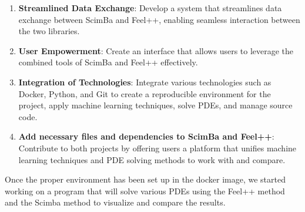 \documentclass[12pt]{article}
\begin{document}
\begin{enumerate}
    \item \textbf{Streamlined Data Exchange}: Develop a system that streamlines data exchange between ScimBa and Feel++, enabling seamless interaction between the two libraries.
    
    \item \textbf{User Empowerment}: Create an interface that allows users to leverage the combined tools of ScimBa and Feel++ effectively.
    
    \item \textbf{Integration of Technologies}: Integrate various technologies such as Docker, Python, and Git to create a reproducible environment for the project, apply machine learning techniques, solve PDEs, and manage source code.
    
    \item \textbf{Add necessary files and dependencies to ScimBa and Feel++}: Contribute to both projects by offering users a platform that unifies machine learning techniques and PDE solving methods to work with and compare.
\end{enumerate}

Once the proper environment has been set up in the docker image, we started working on a program that will solve various PDEs using the Feel++ method and the Scimba method to visualize and compare the results.
\end{document}

